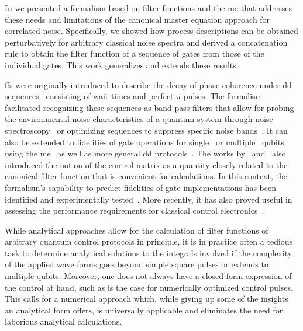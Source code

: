 In  we presented a formalism based on filter functions and the \gls{me} that addresses these needs and limitations of the canonical master equation approach for correlated noise.
Specifically, we showed how process descriptions can be obtained perturbatively for arbitrary classical noise spectra and derived a concatenation rule to obtain the filter function of a sequence of gates from those of the individual gates.
This work generalizes and extends these results.

\Glspl{ff} were originally introduced to describe the decay of phase coherence under \gls{dd} sequences~\cite{Kofman2001,Martinis2003,Uhrig2007,Cywinski2008} consisting of wait times and perfect $\pi$-pulses.
The formalism facilitated recognizing these sequences as band-pass filters that allow for probing the environmental noise characteristics of a quantum system through noise spectroscopy~\cite{Alvarez2011,Bylander2011,Paz-Silva2017,Malinowski2017} or optimizing sequences to suppress specific noise bands~\cite{Biercuk2009,Uys2009,Soare2014,Malinowski2016}.
It can also be extended to fidelities of gate operations for single~\cite{Green2012,Green2013} or multiple~\cite{Gungordu2018,Ball2020} qubits using the \gls{me}~\cite{Magnus1954,Blanes2009} as well as more general \gls{dd} protocols~\cite{Paz-Silva2014}.
The works by~\textcite{Green2013} and~\textcite{Clausen2010} also introduced the notion of the control matrix as a quantity closely related to the canonical filter function that is convenient for calculations.
In this context, the formalism's capability to predict fidelities of gate implementations has been identified and experimentally tested~\cite{Green2013,Kabytayev2014,Soare2014,Ball2016}.
More recently, it has also proved useful in assessing the performance requirements for classical control electronics~\cite{VanDijk2019}.

While analytical approaches allow for the calculation of filter functions of arbitrary quantum control protocols in principle, it is in practice often a tedious task to determine analytical solutions to the integrals involved if the complexity of the applied wave forms goes beyond simple square pulses or extends to multiple qubits.
Moreover, one does not always have a closed-form expression of the control at hand, such as is the case for numerically optimized control pulses.
This calls for a numerical approach which, while giving up some of the insights an analytical form offers, is universally applicable and eliminates the need for laborious analytical calculations.

